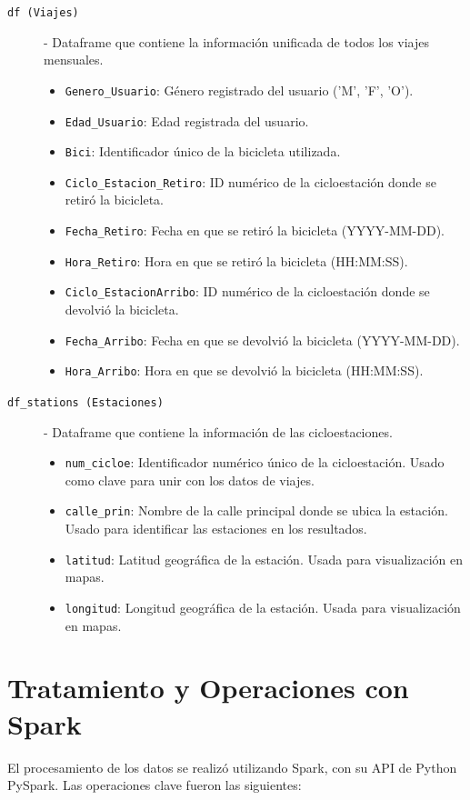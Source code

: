 \documentclass[12pt]{article}
\begin{document}
    \begin{description}
        \item[\texttt{df (Viajes)}] - Dataframe que contiene la información unificada de todos los viajes mensuales.
        \begin{itemize}
            \item \texttt{Genero\_Usuario}: Género registrado del usuario ('M', 'F', 'O').
            \item \texttt{Edad\_Usuario}: Edad registrada del usuario.
            \item \texttt{Bici}: Identificador único de la bicicleta utilizada.
            \item \texttt{Ciclo\_Estacion\_Retiro}: ID numérico de la cicloestación donde se retiró la bicicleta.
            \item \texttt{Fecha\_Retiro}: Fecha en que se retiró la bicicleta (YYYY-MM-DD).
            \item \texttt{Hora\_Retiro}: Hora en que se retiró la bicicleta (HH:MM:SS).
            \item \texttt{Ciclo\_EstacionArribo}: ID numérico de la cicloestación donde se devolvió la bicicleta.
            \item \texttt{Fecha\_Arribo}: Fecha en que se devolvió la bicicleta (YYYY-MM-DD).
            \item \texttt{Hora\_Arribo}: Hora en que se devolvió la bicicleta (HH:MM:SS).
        \end{itemize}
        \item[\texttt{df\_stations (Estaciones)}] - Dataframe que contiene la información de las cicloestaciones.
        \begin{itemize}
            \item \texttt{num\_cicloe}: Identificador numérico único de la cicloestación. Usado como clave para unir con los datos de viajes.
            \item \texttt{calle\_prin}: Nombre de la calle principal donde se ubica la estación. Usado para identificar las estaciones en los resultados.
            \item \texttt{latitud}: Latitud geográfica de la estación. Usada para visualización en mapas.
            \item \texttt{longitud}: Longitud geográfica de la estación. Usada para visualización en mapas.
        \end{itemize}
    \end{description}

\section{Tratamiento y Operaciones con Spark}
    El procesamiento de los datos se realizó utilizando Spark, con su API de Python PySpark. Las operaciones clave fueron las siguientes:
\end{document}

